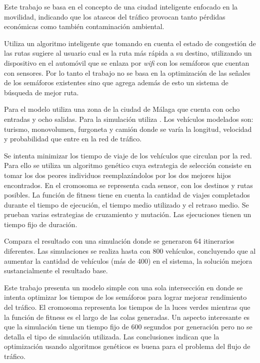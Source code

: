 \begin{itemize}
\begin{item}
Este trabajo se basa en el concepto de una ciudad inteligente enfocado en la movilidad, indicando que los atascos del tráfico provocan tanto pérdidas económicas como también contaminación ambiental.

Utiliza un algoritmo inteligente que tomando en cuenta el estado de congestión de las rutas sugiere al usuario cual es la ruta más rápida a su destino, utilizando un dispositivo en el automóvil que se enlaza por \emph{wifi} con los semáforos que cuentan con sensores. Por lo tanto el trabajo no se basa en la optimización de las señales de los semáforos existentes sino que agrega además de esto un sistema de búsqueda de mejor ruta.

Para el modelo utiliza una zona  de la ciudad de Málaga que cuenta con ocho entradas y ocho salidas. Para la simulación utiliza \citet{SUMO}. Los vehículos modelados son: turismo, monovolumen, furgoneta y camión donde se varía la longitud, velocidad y probabilidad que entre en la red de tráfico.

Se intenta minimizar los tiempo de viaje de los vehículos que circulan por la red. Para ello se utiliza un algoritmo genético cuya estrategia de selección consiste en tomar los dos peores individuos reemplazándolos por los dos mejores hijos encontrados. En el cromosoma se representa cada sensor, con los destinos y rutas posibles. La función de fitness tiene en cuenta la cantidad de viajes completados durante el tiempo de ejecución, el tiempo medio utilizado y el retraso medio. Se prueban varias estrategias de cruzamiento y mutación. Las ejecuciones tienen un tiempo fijo de duración.

Compara el resultado con una simulación donde se generaron 64 itinerarios diferentes. Las simulaciones se realiza hasta con 800 vehículos, concluyendo que al aumentar la cantidad de vehículos (más de 400) en el sistema, la solución mejora sustancialmente el resultado base.

\end{item}	


\begin{item}

Este trabajo presenta un modelo simple con una sola intersección en donde se intenta optimizar los tiempos de los semáforos para lograr mejorar rendimiento del tráfico. El cromosoma representa los tiempos de la luces verdes mientras que la función de fitness es el largo de las colas generadas. Un aspecto interesante es que la simulación tiene un tiempo fijo de 600 segundos por generación pero no se detalla el tipo de simulación utilizada. Las conclusiones indican que la optimización usando algoritmos genéticos  es buena para el problema del flujo de tráfico.	
\end{item}	



\end{itemize}
